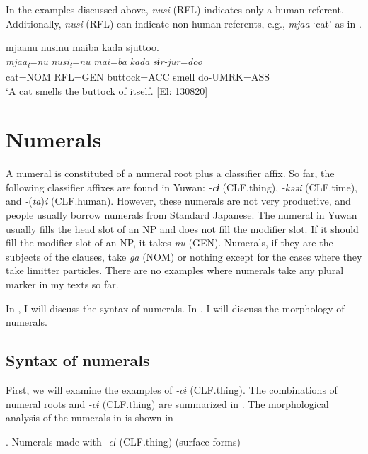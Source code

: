   In the examples discussed above, \textit{nusi} (RFL) indicates only a human referent. Additionally, \textit{nusi} (RFL) can indicate non-human referents, e.g., \textit{mjaa} ‘cat’ as in .

\ea \label{ex:7:11}  %
\glll  mjaanu  nusinu  maiba  kada  sjuttoo.\\
\textit{mjaa\textsubscript{i}}\textit{=nu}  \textit{nusi\textsubscript{i}}\textit{=nu}  \textit{mai=ba}  \textit{kada}  \textit{sɨr-jur=doo}\\
cat=NOM  RFL=GEN  buttock=ACC  smell  do-UMRK=ASS\\
\glt ‘A cat smells the buttock of itself. [El: 130820]
\z

\section{Numerals}

A numeral is constituted of a numeral root plus a classifier affix. So far, the following classifier affixes are found in Yuwan: \textit{{}-cɨ} (CLF.thing), \textit{{}-kəəi} (CLF.time), and \textit{{}-}(\textit{ta})\textit{i} (CLF.human). However, these numerals are not very productive, and people usually borrow numerals from Standard Japanese. The numeral in Yuwan usually fills the head slot of an NP and does not fill the modifier slot. If it should fill the modifier slot of an NP, it takes \textit{nu} (GEN). Numerals, if they are the subjects of the clauses, take \textit{ga} (NOM) or nothing except for the cases where they take limitter particles. There are no examples where numerals take any plural marker in my texts so far.

  In , I will discuss the syntax of numerals. In , I will discuss the morphology of numerals.

\subsection{Syntax of numerals}

First, we will examine the examples of \textit{{}-cɨ} (CLF.thing). The combinations of numeral roots and \textit{{}-cɨ} (CLF.thing) are summarized in . The morphological analysis of the numerals in  is shown in 

\begin{styleBeschriftung}
\textmd{}\textmd{. Numerals made with}\textmd{ \textit{-cɨ}}\textmd{ (CLF.thing) (surface forms)}
\end{styleBeschriftung}

